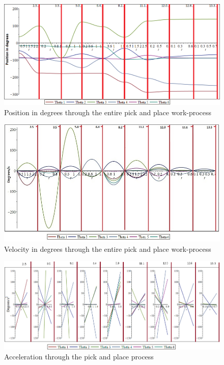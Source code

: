 \begin{figure}[H]
    \includegraphics[width=\textwidth]{Design/Positionsgraf.png}
    \caption{Position in degrees through the entire pick and place work-process}
    \label{fig:posCyc}
\end{figure}
\begin{figure}[H]
    \includegraphics[width = \textwidth]{Design/Dpers.jpg}
    \caption{Velocity in degrees through the entire pick and place work-process}
    \label{fig:velCyc}
\end{figure}
\begin{figure}[H]
    \includegraphics[width=\textwidth]{Design/Accelerationgraf1.png}
    \caption{Acceleration through the pick and place process}
    \label{fig:accCyc}
\end{figure}
